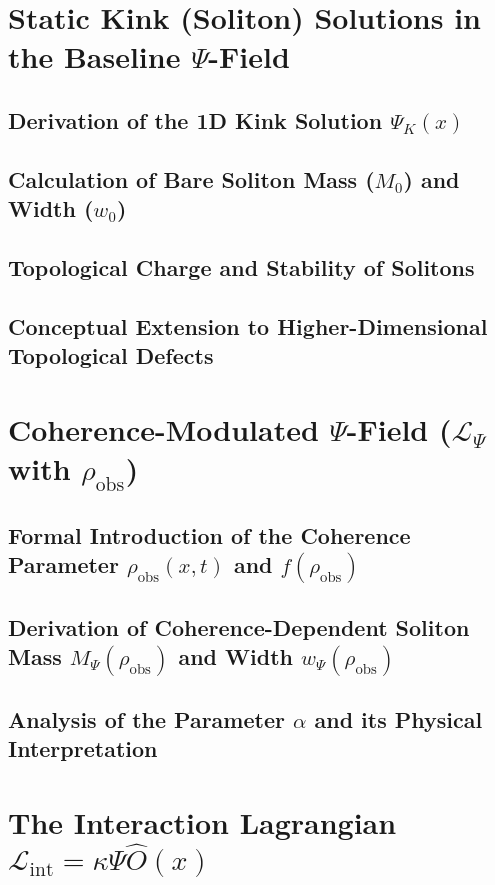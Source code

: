 \documentclass[11pt, a4paper]{book}
\begin{document}
\section{Static Kink (Soliton) Solutions in the Baseline $\Psi$-Field}
\subsection{Derivation of the 1D Kink Solution $\Psi_K(x)$}
\subsection{Calculation of Bare Soliton Mass ($M_0$) and Width ($w_0$)}
\subsection{Topological Charge and Stability of Solitons}
\subsection{Conceptual Extension to Higher-Dimensional Topological Defects}

\section{Coherence-Modulated $\Psi$-Field ($\mathcal{L}_\Psi$ with $\rho_{\text{obs}}$)}
\subsection{Formal Introduction of the Coherence Parameter $\rho_{\text{obs}}(x,t)$ and $f(\rho_{\text{obs}})$}
\subsection{Derivation of Coherence-Dependent Soliton Mass $M_\Psi(\rho_{\text{obs}})$ and Width $w_\Psi(\rho_{\text{obs}})$}
\subsection{Analysis of the Parameter $\alpha$ and its Physical Interpretation}

\section{The Interaction Lagrangian $\mathcal{L}_{\text{int}} = \kappa \Psi \hat{O}(x)$}
\end{document}
